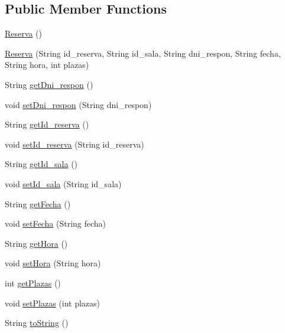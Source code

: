 \subsection*{Public Member Functions}
\begin{DoxyCompactItemize}
\item 
\mbox{\hyperlink{classes_1_1deusto_1_1spq_1_1biblioteca_1_1data_1_1_reserva_a1a9b1b99f25afdfacdc2d53b66e645b3}{Reserva}} ()
\item 
\mbox{\hyperlink{classes_1_1deusto_1_1spq_1_1biblioteca_1_1data_1_1_reserva_aea6f500fff67d64190894cf97d1f3ada}{Reserva}} (String id\+\_\+reserva, String id\+\_\+sala, String dni\+\_\+respon, String fecha, String hora, int plazas)
\item 
String \mbox{\hyperlink{classes_1_1deusto_1_1spq_1_1biblioteca_1_1data_1_1_reserva_a6c02bf1ca4b29a4a8ac6df9ac89faa9b}{get\+Dni\+\_\+respon}} ()
\item 
void \mbox{\hyperlink{classes_1_1deusto_1_1spq_1_1biblioteca_1_1data_1_1_reserva_ae6356c00e8604153c66aca9c1c7bf602}{set\+Dni\+\_\+respon}} (String dni\+\_\+respon)
\item 
String \mbox{\hyperlink{classes_1_1deusto_1_1spq_1_1biblioteca_1_1data_1_1_reserva_a50da30de128069b7e793e72a10c0cdd9}{get\+Id\+\_\+reserva}} ()
\item 
void \mbox{\hyperlink{classes_1_1deusto_1_1spq_1_1biblioteca_1_1data_1_1_reserva_adc5dff7fa7cfd688de23eff823dcb158}{set\+Id\+\_\+reserva}} (String id\+\_\+reserva)
\item 
String \mbox{\hyperlink{classes_1_1deusto_1_1spq_1_1biblioteca_1_1data_1_1_reserva_a011ade5ee624395a738a300551f0413e}{get\+Id\+\_\+sala}} ()
\item 
void \mbox{\hyperlink{classes_1_1deusto_1_1spq_1_1biblioteca_1_1data_1_1_reserva_a8224d05e091bfb709d31e799c6b27368}{set\+Id\+\_\+sala}} (String id\+\_\+sala)
\item 
String \mbox{\hyperlink{classes_1_1deusto_1_1spq_1_1biblioteca_1_1data_1_1_reserva_ae3c4ad48c63acf8f7b2a8cb85cb32266}{get\+Fecha}} ()
\item 
void \mbox{\hyperlink{classes_1_1deusto_1_1spq_1_1biblioteca_1_1data_1_1_reserva_abb94b86f010bf14cddf6912a961c1c9f}{set\+Fecha}} (String fecha)
\item 
String \mbox{\hyperlink{classes_1_1deusto_1_1spq_1_1biblioteca_1_1data_1_1_reserva_a9e26c394bd2b92fc333d90307a5ffe2a}{get\+Hora}} ()
\item 
void \mbox{\hyperlink{classes_1_1deusto_1_1spq_1_1biblioteca_1_1data_1_1_reserva_a12ce2e84ceb67d9ffc9df8fadf8dd699}{set\+Hora}} (String hora)
\item 
int \mbox{\hyperlink{classes_1_1deusto_1_1spq_1_1biblioteca_1_1data_1_1_reserva_a106193dad77251c988277714d9e83af6}{get\+Plazas}} ()
\item 
void \mbox{\hyperlink{classes_1_1deusto_1_1spq_1_1biblioteca_1_1data_1_1_reserva_a249618df4bc0ad60c036a9d67267da7a}{set\+Plazas}} (int plazas)
\item 
String \mbox{\hyperlink{classes_1_1deusto_1_1spq_1_1biblioteca_1_1data_1_1_reserva_a07deac8f8e9adabfc2f927a22593c322}{to\+String}} ()
\end{DoxyCompactItemize}


